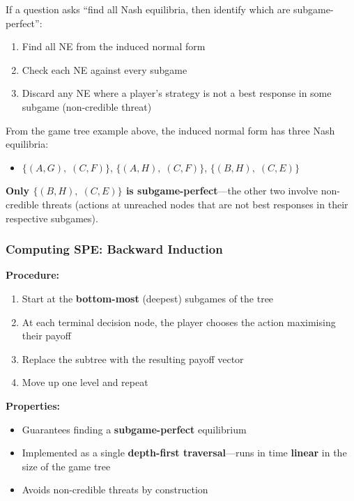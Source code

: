 \begin{tipbox}
If a question asks ``find all Nash equilibria, then identify which are subgame-perfect'':
\begin{enumerate}
  \item Find all NE from the induced normal form
  \item Check each NE against every subgame
  \item Discard any NE where a player's strategy is not a best response in some subgame (non-credible threat)
\end{enumerate}
\end{tipbox}

\begin{exbox}
From the game tree example above, the induced normal form has three Nash equilibria:
\begin{itemize}
  \item $\{(A,G),\; (C,F)\}$, \quad $\{(A,H),\; (C,F)\}$, \quad $\{(B,H),\; (C,E)\}$
\end{itemize}

\textbf{Only $\{(B,H),\; (C,E)\}$ is subgame-perfect}---the other two involve non-credible threats (actions at unreached nodes that are not best responses in their respective subgames).
\end{exbox}

\separator

\subsubsection{Computing SPE: Backward Induction}

\begin{thmbox}
\textbf{Procedure:}
\begin{enumerate}
  \item Start at the \textbf{bottom-most} (deepest) subgames of the tree
  \item At each terminal decision node, the player chooses the action maximising their payoff
  \item Replace the subtree with the resulting payoff vector
  \item Move up one level and repeat
\end{enumerate}

\textbf{Properties:}
\begin{itemize}
  \item Guarantees finding a \textbf{subgame-perfect} equilibrium
  \item Implemented as a single \textbf{depth-first traversal}---runs in time \textbf{linear} in the size of the game tree
  \item Avoids non-credible threats by construction
\end{itemize}
\end{thmbox}

